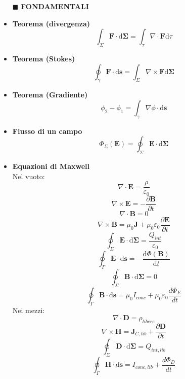 \documentclass{book}
\newcommand{\g}{\textbf}
\newcommand{\h}{\mathbf}
\newcommand{\e}{\begin{equation}}
\newcommand{\ex}{\end{equation} }
\renewcommand{\it}{\item[$\cdot$]}
\begin{document}
\begin{multicols}{4}
\begin{itemize}

\item [$\blacksquare$] \g{FONDAMENTALI}
    \it \g{Teorema (divergenza)}
        \e{\int_\Sigma \h{F} \cdot \mathrm{d} \h{\Sigma}= \int_\tau \nabla \cdot \h{F} \mathrm{d}\tau} \ex
    \it \g{Teorema (Stokes)}
        \e{\oint_\gamma\h{F}\cdot \mathrm{d}\h{s}=\int_\Sigma \nabla \times \h{F} \mathrm{d}\h{\Sigma}} \ex
    \it \g{Teorema (Gradiente)}
        \e{\phi_2-\phi_1=\int_\gamma\nabla\phi\cdot \mathrm{d}\h{s} }\ex
    \it \g{Flusso di un campo}
        \e{ \Phi_\Sigma(\h{E})=\oint_\Sigma \h{E}\cdot \mathrm{d}\h{\Sigma}   
        } \ex
    \it \g{Equazioni di Maxwell} \\
        Nel vuoto:
        \e{\nabla\cdot\h{E}=\frac{\rho}{\varepsilon_0}}\ex
        \e{\nabla\times\h{E}=-\frac{\partial \h{B}}{\partial t}} \ex
        \e{\nabla\cdot\h{B}}=0\ex
        \e{\nabla\times\h{B}=\mu_0\h{J}+\mu_0\varepsilon_0\frac{\partial \h{E}}{\partial t}} \ex
        \e{\oint_\Sigma\h{E}\cdot \mathrm{d}\h{\Sigma}=\frac{Q_{int}}{\varepsilon_0}} \ex
        \e{\oint_\Gamma\h{E}\cdot \mathrm{d}\h{s}=-\frac{\mathrm{d} \Phi(\h{B})}{\mathrm{d}t}} \ex
        \e{\oint_\Sigma\h{B}\cdot \mathrm{d}\h{\Sigma}=0} \ex
        \e{\oint_\Gamma\h{B}\cdot \mathrm{d}\h{s}=\mu_0 I_{conc} +\mu_0\varepsilon_0\frac{d \Phi_E}{d t}} \ex
        Nei mezzi:
        \e{\nabla\cdot\h{D}=\rho_{libere}}\ex
        \e{\nabla\times\h{H}=\h{J}_{C,lib}+\frac{\partial\h{D}}{\partial t}} \ex
        \e{\oint_\Sigma\h{D}\cdot \mathrm{d}\h{\Sigma}=Q_{int,lib}} \ex
        \e{\oint_\Gamma\h{H}\cdot \mathrm{d}\h{s}=I_{conc,lib} + \frac{d \Phi_D}{d t}} \ex


\end{itemize}
\end{multicols}
\end{document}
